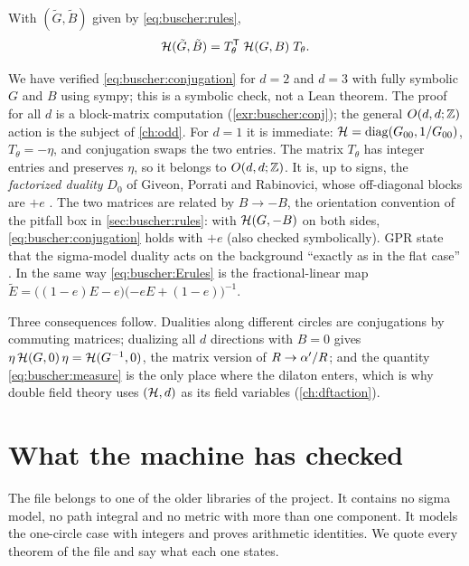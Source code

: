 \begin{proposition}\label{prop:buscher:conjugation}
With $(\tilde G,\tilde B)$ given by \eqref{eq:buscher:rules},
\begin{equation}\label{eq:buscher:conjugation}
 \mathcal{H}(\tilde G,\tilde B)=T_\theta^{\mathsf T}\;\mathcal{H}(G,B)\;T_\theta .
\end{equation}
\end{proposition}
We have verified \eqref{eq:buscher:conjugation} for $d=2$ and $d=3$ with fully symbolic $G$
and $B$ using sympy; this is a symbolic check, not a Lean theorem. The proof for all $d$ is a
block-matrix computation (\cref{exr:buscher:conj}); the general $O(d,d;\mathbb{Z})$ action is the
subject of \cref{ch:odd}. For $d=1$ it is immediate:
$\mathcal{H}=\operatorname{diag}(G_{00},1/G_{00})$, $T_\theta=-\eta$, and conjugation swaps the two entries. The
matrix $T_\theta$ has integer entries and preserves $\eta$, so it belongs to $O(d,d;\mathbb{Z})$. It
is, up to signs, the \emph{factorized duality} $D_0$ of Giveon,
Porrati and Rabinovici, whose off-diagonal blocks are $+e$ . The two matrices are related by $B\to-B$, the orientation convention of the
pitfall box in \cref{sec:buscher:rules}: with $\mathcal{H}(G,-B)$ on both sides,
\eqref{eq:buscher:conjugation} holds with $+e$ (also checked symbolically). GPR state that
the sigma-model duality acts on the background ``exactly as in the flat case''
. In the same way \eqref{eq:buscher:Erules} is the
fractional-linear map $\tilde E=\big((1-e)E-e\big)\big({-e}E+(1-e)\big)^{-1}$.

Three consequences follow. Dualities along different circles are conjugations by
commuting matrices; dualizing all $d$ directions with $B=0$ gives
$\eta\,\mathcal{H}(G,0)\,\eta=\mathcal{H}(G^{-1},0)$, the matrix version of $R\to\alpha'/R$; and the
quantity \eqref{eq:buscher:measure} is the only place where the dilaton enters, which is
why double field theory uses $(\mathcal{H},d)$ as its field variables (\cref{ch:dftaction}).

\section{What the machine has checked}\label{sec:buscher:lean}

The file  belongs to one of the older libraries
of the project. It contains no sigma model, no path integral and no metric with more than one
component. It models the one-circle case with integers and proves arithmetic identities. We
quote every theorem of the file and say what each one states.

